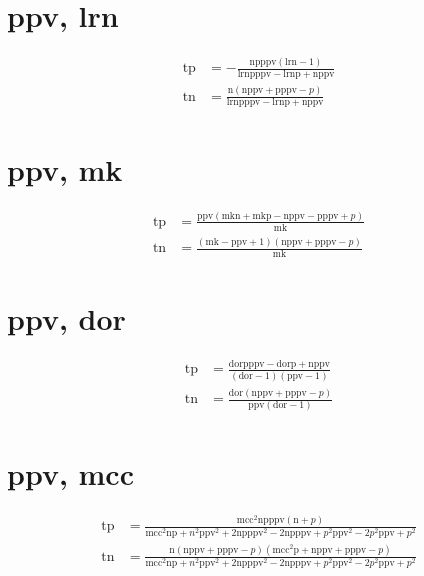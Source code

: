 \documentclass[3p,times]{elsarticle}
\begin{document}
\begin{footnotesize}
\begin{landscape}
\section{ppv, lrn}
\begin{align}
\mathrm{tp} &= - \frac{\mathrm{n} \mathrm{p} \mathrm{ppv} \left(\mathrm{lrn} - 1\right)}{\mathrm{lrn} \mathrm{p} \mathrm{ppv} - \mathrm{lrn} \mathrm{p} + \mathrm{n} \mathrm{ppv}}\\
\mathrm{tn} &= \frac{\mathrm{n} \left(\mathrm{n} \mathrm{ppv} + \mathrm{p} \mathrm{ppv} - p\right)}{\mathrm{lrn} \mathrm{p} \mathrm{ppv} - \mathrm{lrn} \mathrm{p} + \mathrm{n} \mathrm{ppv}}
\end{align}
\section{ppv, mk}
\begin{align}
\mathrm{tp} &= \frac{\mathrm{ppv} \left(\mathrm{mk} \mathrm{n} + \mathrm{mk} \mathrm{p} - \mathrm{n} \mathrm{ppv} - \mathrm{p} \mathrm{ppv} + p\right)}{\mathrm{mk}}\\
\mathrm{tn} &= \frac{\left(\mathrm{mk} - \mathrm{ppv} + 1\right) \left(\mathrm{n} \mathrm{ppv} + \mathrm{p} \mathrm{ppv} - p\right)}{\mathrm{mk}}
\end{align}
\section{ppv, dor}
\begin{align}
\mathrm{tp} &= \frac{\mathrm{dor} \mathrm{p} \mathrm{ppv} - \mathrm{dor} \mathrm{p} + \mathrm{n} \mathrm{ppv}}{\left(\mathrm{dor} - 1\right) \left(\mathrm{ppv} - 1\right)}\\
\mathrm{tn} &= \frac{\mathrm{dor} \left(\mathrm{n} \mathrm{ppv} + \mathrm{p} \mathrm{ppv} - p\right)}{\mathrm{ppv} \left(\mathrm{dor} - 1\right)}
\end{align}
\section{ppv, mcc}
\begin{align}
\mathrm{tp} &= \frac{\mathrm{mcc}^{2} \mathrm{n} \mathrm{p} \mathrm{ppv} \left(\mathrm{n} + p\right)}{\mathrm{mcc}^{2} \mathrm{n} \mathrm{p} + n^{2} \mathrm{ppv}^{2} + 2 \mathrm{n} \mathrm{p} \mathrm{ppv}^{2} - 2 \mathrm{n} \mathrm{p} \mathrm{ppv} + p^{2} \mathrm{ppv}^{2} - 2 p^{2} \mathrm{ppv} + p^{2}}\\
\mathrm{tn} &= \frac{\mathrm{n} \left(\mathrm{n} \mathrm{ppv} + \mathrm{p} \mathrm{ppv} - p\right) \left(\mathrm{mcc}^{2} \mathrm{p} + \mathrm{n} \mathrm{ppv} + \mathrm{p} \mathrm{ppv} - p\right)}{\mathrm{mcc}^{2} \mathrm{n} \mathrm{p} + n^{2} \mathrm{ppv}^{2} + 2 \mathrm{n} \mathrm{p} \mathrm{ppv}^{2} - 2 \mathrm{n} \mathrm{p} \mathrm{ppv} + p^{2} \mathrm{ppv}^{2} - 2 p^{2} \mathrm{ppv} + p^{2}}
\end{align}

\end{landscape}
\end{footnotesize}
\end{document}
